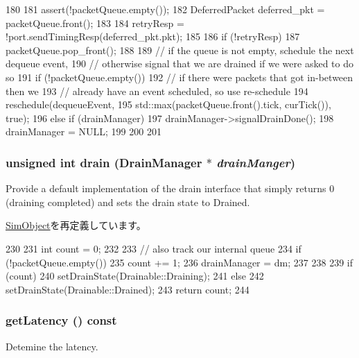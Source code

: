 \begin{DoxyCode}
180 {
181     assert(!packetQueue.empty());
182     DeferredPacket deferred_pkt = packetQueue.front();
183 
184     retryResp = !port.sendTimingResp(deferred_pkt.pkt);
185 
186     if (!retryResp) {
187         packetQueue.pop_front();
188 
189         // if the queue is not empty, schedule the next dequeue event,
190         // otherwise signal that we are drained if we were asked to do so
191         if (!packetQueue.empty()) {
192             // if there were packets that got in-between then we
193             // already have an event scheduled, so use re-schedule
194             reschedule(dequeueEvent,
195                        std::max(packetQueue.front().tick, curTick()), true);
196         } else if (drainManager) {
197             drainManager->signalDrainDone();
198             drainManager = NULL;
199         }
200     }
201 }
\end{DoxyCode}
\hypertarget{classSimpleMemory_aa8a18d230dba7a674ac8a0b4f35bc36a}{
\subsubsection[{drain}]{\setlength{\rightskip}{0pt plus 5cm}unsigned int drain ({\bf DrainManager} $\ast$ {\em drainManger})}}
\label{classSimpleMemory_aa8a18d230dba7a674ac8a0b4f35bc36a}
Provide a default implementation of the drain interface that simply returns 0 (draining completed) and sets the drain state to Drained. 

\hyperlink{classSimObject_a6bf479c521c7c3eb473822d953275b26}{SimObject}を再定義しています。


\begin{DoxyCode}
230 {
231     int count = 0;
232 
233     // also track our internal queue
234     if (!packetQueue.empty()) {
235         count += 1;
236         drainManager = dm;
237     }
238 
239     if (count)
240         setDrainState(Drainable::Draining);
241     else
242         setDrainState(Drainable::Drained);
243     return count;
244 }
\end{DoxyCode}
\hypertarget{classSimpleMemory_aab331854844f48e55c064a1d20d74361}{
\subsubsection[{getLatency}]{ getLatency () const}}
\label{classSimpleMemory_aab331854844f48e55c064a1d20d74361}
Detemine the latency.

